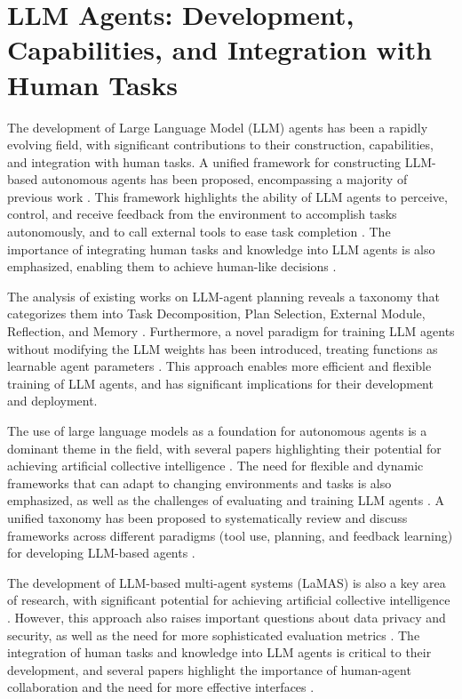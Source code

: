 \documentclass[conference]{IEEEtran}
\begin{document}
\section{LLM Agents: Development, Capabilities, and Integration with Human Tasks}
The development of Large Language Model (LLM) agents has been a rapidly evolving field, with significant contributions to their construction, capabilities, and integration with human tasks. A unified framework for constructing LLM-based autonomous agents has been proposed, encompassing a majority of previous work \cite{2308.11432}. This framework highlights the ability of LLM agents to perceive, control, and receive feedback from the environment to accomplish tasks autonomously, and to call external tools to ease task completion \cite{2411.14033}. The importance of integrating human tasks and knowledge into LLM agents is also emphasized, enabling them to achieve human-like decisions \cite{2402.02716}.

The analysis of existing works on LLM-agent planning reveals a taxonomy that categorizes them into Task Decomposition, Plan Selection, External Module, Reflection, and Memory \cite{2402.11359}. Furthermore, a novel paradigm for training LLM agents without modifying the LLM weights has been introduced, treating functions as learnable agent parameters \cite{2406.05804}. This approach enables more efficient and flexible training of LLM agents, and has significant implications for their development and deployment.

The use of large language models as a foundation for autonomous agents is a dominant theme in the field, with several papers highlighting their potential for achieving artificial collective intelligence \cite{2411.14033, 2402.01680}. The need for flexible and dynamic frameworks that can adapt to changing environments and tasks is also emphasized, as well as the challenges of evaluating and training LLM agents \cite{2308.03688, 2412.04093}. A unified taxonomy has been proposed to systematically review and discuss frameworks across different paradigms (tool use, planning, and feedback learning) for developing LLM-based agents \cite{2406.05804}.

The development of LLM-based multi-agent systems (LaMAS) is also a key area of research, with significant potential for achieving artificial collective intelligence \cite{2411.14033}. However, this approach also raises important questions about data privacy and security, as well as the need for more sophisticated evaluation metrics \cite{2402.01680}. The integration of human tasks and knowledge into LLM agents is critical to their development, and several papers highlight the importance of human-agent collaboration and the need for more effective interfaces \cite{2412.15701, 2308.03688}.
\end{document}
